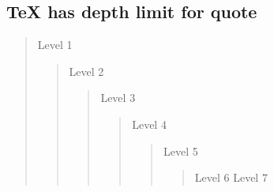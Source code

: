 
\subsection*{TeX has depth limit for quote}
	\begin{quotation}
Level 1
		\begin{quotation}
Level 2
			\begin{quotation}
Level 3
				\begin{quotation}
Level 4
					\begin{quotation}
Level 5
						\begin{quotation}
Level 6
Level 7
						\end{quotation}
					\end{quotation}
				\end{quotation}
			\end{quotation}
		\end{quotation}
	\end{quotation}
